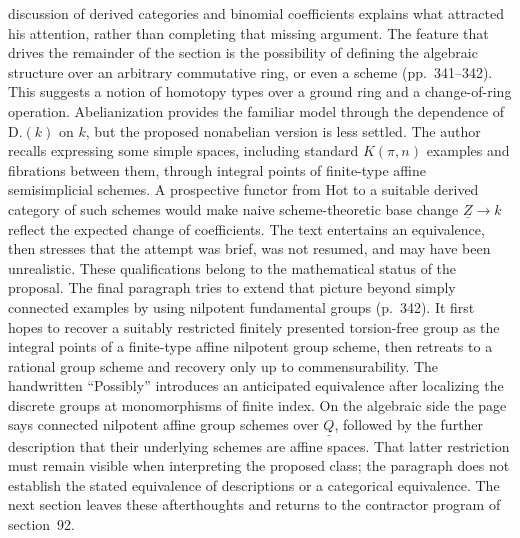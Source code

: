 \documentclass[10pt,oneside]{book}
\begin{document}
discussion of derived categories and binomial coefficients explains what attracted his attention, rather than completing that missing argument. The feature that drives the remainder of the section is the possibility of defining the algebraic structure over an arbitrary commutative ring, or even a scheme (pp.~341--342). This suggests a notion of homotopy types over a ground ring and a change-of-ring operation. Abelianization provides the familiar model through the dependence of $\mathrm{D.}(k)$ on $k$, but the proposed nonabelian version is less settled. The author recalls expressing some simple spaces, including standard $K(\pi,n)$ examples and fibrations between them, through integral points of finite-type affine semisimplicial schemes. A prospective functor from $\mathrm{Hot}$ to a suitable derived category of such schemes would make naive scheme-theoretic base change $\underline Z\to k$ reflect the expected change of coefficients. The text entertains an equivalence, then stresses that the attempt was brief, was not resumed, and may have been unrealistic. These qualifications belong to the mathematical status of the proposal. The final paragraph tries to extend that picture beyond simply connected examples by using nilpotent fundamental groups (p.~342). It first hopes to recover a suitably restricted finitely presented torsion-free group as the integral points of a finite-type affine nilpotent group scheme, then retreats to a rational group scheme and recovery only up to commensurability. The handwritten ``Possibly'' introduces an anticipated equivalence after localizing the discrete groups at monomorphisms of finite index. On the algebraic side the page says connected nilpotent affine group schemes over $\underline Q$, followed by the further description that their underlying schemes are affine spaces. That latter restriction must remain visible when interpreting the proposed class; the paragraph does not establish the stated equivalence of descriptions or a categorical equivalence. The next section leaves these afterthoughts and returns to the contractor program of section~92.
\end{document}
